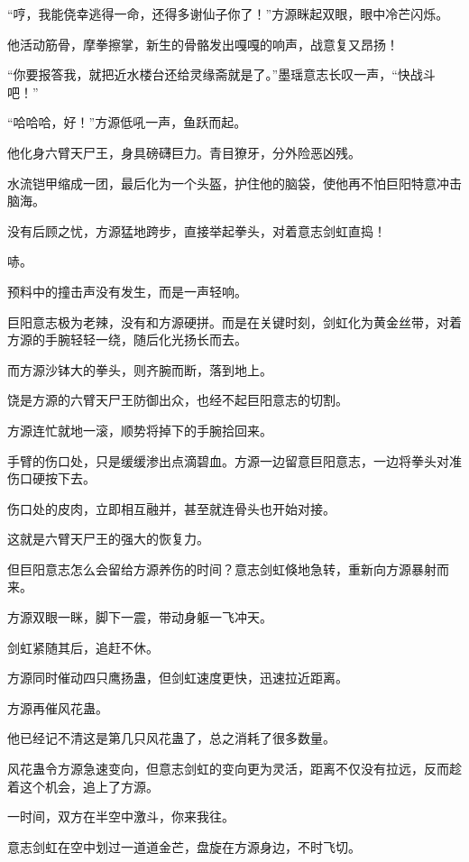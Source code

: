 
\begin{this_body}

“哼，我能侥幸逃得一命，还得多谢仙子你了！”方源眯起双眼，眼中冷芒闪烁。

他活动筋骨，摩拳擦掌，新生的骨骼发出嘎嘎的响声，战意复又昂扬！

“你要报答我，就把近水楼台还给灵缘斋就是了。”墨瑶意志长叹一声，“快战斗吧！”

“哈哈哈，好！”方源低吼一声，鱼跃而起。

他化身六臂天尸王，身具磅礴巨力。青目獠牙，分外险恶凶残。

水流铠甲缩成一团，最后化为一个头盔，护住他的脑袋，使他再不怕巨阳特意冲击脑海。

没有后顾之忧，方源猛地跨步，直接举起拳头，对着意志剑虹直捣！

哧。

预料中的撞击声没有发生，而是一声轻响。

巨阳意志极为老辣，没有和方源硬拼。而是在关键时刻，剑虹化为黄金丝带，对着方源的手腕轻轻一绕，随后化光扬长而去。

而方源沙钵大的拳头，则齐腕而断，落到地上。

饶是方源的六臂天尸王防御出众，也经不起巨阳意志的切割。

方源连忙就地一滚，顺势将掉下的手腕拾回来。

手臂的伤口处，只是缓缓渗出点滴碧血。方源一边留意巨阳意志，一边将拳头对准伤口硬按下去。

伤口处的皮肉，立即相互融并，甚至就连骨头也开始对接。

这就是六臂天尸王的强大的恢复力。

但巨阳意志怎么会留给方源养伤的时间？意志剑虹倏地急转，重新向方源暴射而来。

方源双眼一眯，脚下一震，带动身躯一飞冲天。

剑虹紧随其后，追赶不休。

方源同时催动四只鹰扬蛊，但剑虹速度更快，迅速拉近距离。

方源再催风花蛊。

他已经记不清这是第几只风花蛊了，总之消耗了很多数量。

风花蛊令方源急速变向，但意志剑虹的变向更为灵活，距离不仅没有拉远，反而趁着这个机会，追上了方源。

一时间，双方在半空中激斗，你来我往。

意志剑虹在空中划过一道道金芒，盘旋在方源身边，不时飞切。


\end{this_body}
